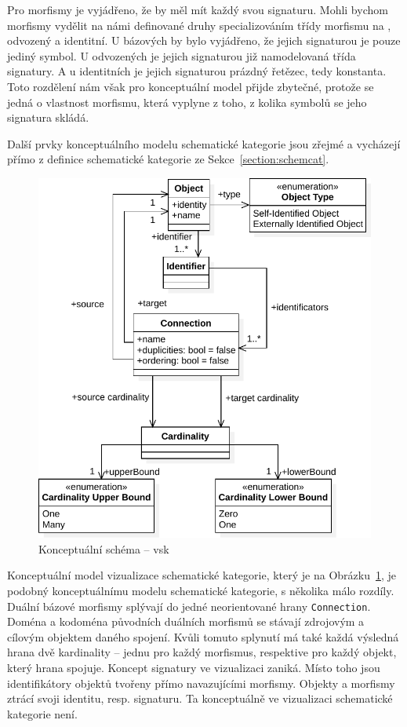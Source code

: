 Pro morfismy je vyjádřeno, že by měl mít každý svou signaturu.
Mohli bychom morfismy vydělit na námi definované druhy specializováním třídy morfismu na , odvozený a identitní.
U bázových by bylo vyjádřeno, že jejich signaturou je pouze jediný symbol.
U odvozených je jejich signaturou již namodelovaná třída signatury.
A u identitních je jejich signaturou prázdný řetězec, tedy konstanta.
Toto rozdělení nám však pro konceptuální model přijde zbytečné, protože se jedná o vlastnost morfismu, která vyplyne z toho, z kolika symbolů se jeho signatura skládá.

Další prvky konceptuálního modelu schematické kategorie jsou zřejmé a vycházejí přímo z definice schematické kategorie ze Sekce~\ref{section:schemcat}.

\begin{figure}[!htb]
  \centering
  \includegraphics[width=\maxwidth{\textwidth}]{../img/diagrams/scv-model.pdf}
  \caption{Konceptuální schéma -- \acrlong{vsk}}
  \label{fig:class-diagram:scv}
\end{figure}

Konceptuální model vizualizace schematické kategorie, který je na Obrázku~\ref{fig:class-diagram:scv}, je podobný konceptuálnímu modelu schematické kategorie, s několika málo rozdíly.
Duální bázové morfismy splývají do jedné neorientované hrany \texttt{Connection}.
Doména a kodoména původních duálních morfismů se stávají zdrojovým a cílovým objektem daného spojení.
Kvůli tomuto splynutí má také každá výsledná hrana dvě kardinality -- jednu pro každý morfismus, respektive pro každý objekt, který hrana spojuje.
Koncept signatury ve vizualizaci zaniká.
Místo toho jsou identifikátory objektů tvořeny přímo navazujícími morfismy.
Objekty a morfismy ztrácí svoji identitu, resp. signaturu.
Ta konceptuálně ve vizualizaci schematické kategorie není.

